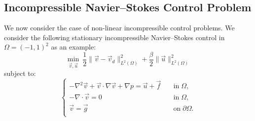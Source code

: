 \documentclass[letterpaper,10pt,english]{sphinxmanual}
\begin{document}
\subsection{Incompressible Navier--Stokes Control Problem}
We now consider the case of non-linear incompressible control problems. We consider the following stationary incompressible Navier--Stokes control in $\Omega = (-1,1)^2$ as an example:
\begin{displaymath}
\min_{\vec{v},\vec{u}} ~ \frac{1}{2} \| \vec{v} - \vec{v}_d \|^2_{L^2(\Omega)} + \frac{\beta}{2} \| \vec{u} \|^2_{L^2(\Omega)}
\end{displaymath}
subject to:
\begin{displaymath}
\left\{
\begin{array}{ll}
- \nabla^2 \vec{v} + \vec{v} \cdot \nabla \vec{v} + \nabla p = \vec{u} + \vec{f} & \quad \mathrm{in} \; \Omega,\\
- \nabla \cdot \vec{v} = 0 & \quad \mathrm{in} \; \Omega,\\
\vec{v} = \vec{g} & \quad \mathrm{on} \; \partial \Omega.\\
\end{array}
\right.
\end{displaymath}
\end{document}
